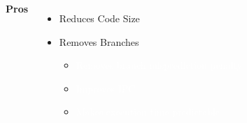 \begin{columns}[t] %
        \textbf{Pros}
        \begin{itemize}
            \item Reduces Code Size
            \item Removes Branches
            \begin{itemize}
                \item  \textcolor{white}{Removes branch misprediction penalty}
                \item  \textcolor{white}{Improves IPC}
                \item  \textcolor{white}{Makes execution time predictable}
            \end{itemize}
        \end{itemize}


\end{columns}